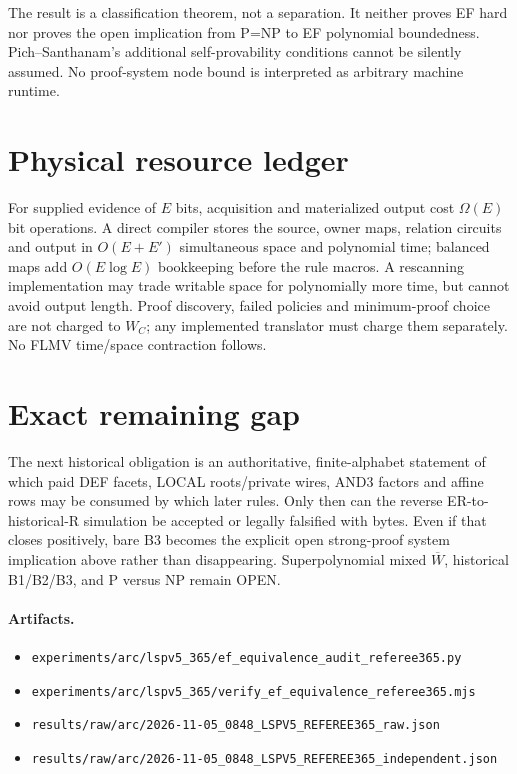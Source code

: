 \documentclass[11pt]{article}
\begin{document}
The result is a classification theorem, not a separation.  It neither proves
EF hard nor proves the open implication from P=NP to EF polynomial
boundedness.  Pich--Santhanam's additional self-provability conditions cannot
be silently assumed.  No proof-system node bound is interpreted as arbitrary
machine runtime.

\section{Physical resource ledger}

For supplied evidence of $E$ bits, acquisition and materialized output cost
$\Omega(E)$ bit operations.  A direct compiler stores the source, owner maps,
relation circuits and output in $O(E+E')$ simultaneous space and polynomial
time; balanced maps add $O(E\log E)$ bookkeeping before the rule macros.  A
rescanning implementation may trade writable space for polynomially more
time, but cannot avoid output length.  Proof discovery, failed policies and
minimum-proof choice are not charged to $W_C$; any implemented translator must
charge them separately.  No FLMV time/space contraction follows.

\section{Exact remaining gap}

The next historical obligation is an authoritative, finite-alphabet statement
of which paid DEF facets, LOCAL roots/private wires, AND3 factors and affine
rows may be consumed by which later rules.  Only then can the reverse
ER-to-historical-R simulation be accepted or legally falsified with bytes.
Even if that closes positively, bare B3 becomes the explicit open strong-proof
system implication above rather than disappearing.  Superpolynomial mixed
$\overline W$, historical B1/B2/B3, and P versus NP remain OPEN.

\paragraph{Artifacts.}
\begin{itemize}
\item \texttt{experiments/arc/lspv5\_365/ef\_equivalence\_audit\_referee365.py}
\item \texttt{experiments/arc/lspv5\_365/verify\_ef\_equivalence\_referee365.mjs}
\item \texttt{results/raw/arc/2026-11-05\_0848\_LSPV5\_REFEREE365\_raw.json}
\item \texttt{results/raw/arc/2026-11-05\_0848\_LSPV5\_REFEREE365\_independent.json}
\end{itemize}
\end{document}
